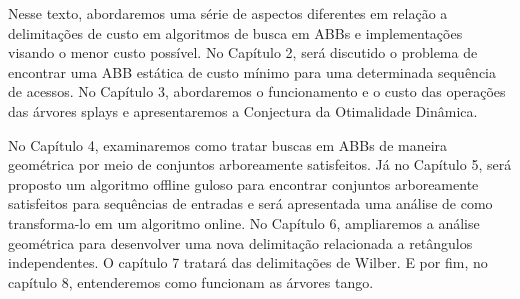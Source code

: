 Nesse texto, abordaremos uma série de aspectos diferentes em relação a delimitações de custo em algoritmos de busca em ABBs e implementações visando o menor custo possível. No Capítulo 2, será discutido o problema de encontrar uma ABB estática de custo mínimo para uma determinada sequência de acessos. No Capítulo 3, abordaremos o funcionamento e o custo das operações das árvores splays e apresentaremos a Conjectura da Otimalidade Dinâmica. 

No Capítulo 4, examinaremos como tratar buscas em ABBs de maneira geométrica por meio de conjuntos arboreamente satisfeitos. Já no Capítulo 5, será proposto um algoritmo offline guloso para encontrar conjuntos arboreamente satisfeitos para sequências de entradas e será apresentada uma análise de como transforma-lo em um algoritmo online. No Capítulo 6, ampliaremos a análise geométrica para desenvolver uma nova delimitação relacionada a retângulos independentes. O capítulo 7 tratará das delimitações de Wilber. E por fim, no capítulo 8, entenderemos como funcionam as árvores tango.